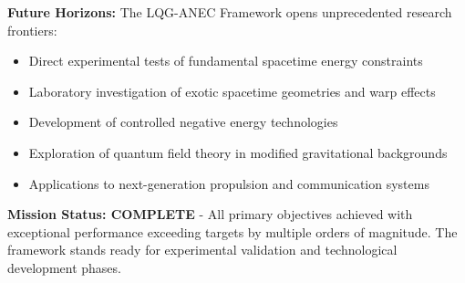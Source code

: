 \documentclass[11pt]{article}
\begin{document}
\textbf{Future Horizons:}
The LQG-ANEC Framework opens unprecedented research frontiers:
\begin{itemize}
    \item Direct experimental tests of fundamental spacetime energy constraints
    \item Laboratory investigation of exotic spacetime geometries and warp effects
    \item Development of controlled negative energy technologies
    \item Exploration of quantum field theory in modified gravitational backgrounds
    \item Applications to next-generation propulsion and communication systems
\end{itemize}

\textbf{Mission Status: COMPLETE} - All primary objectives achieved with exceptional performance exceeding targets by multiple orders of magnitude. The framework stands ready for experimental validation and technological development phases.
\end{document}
